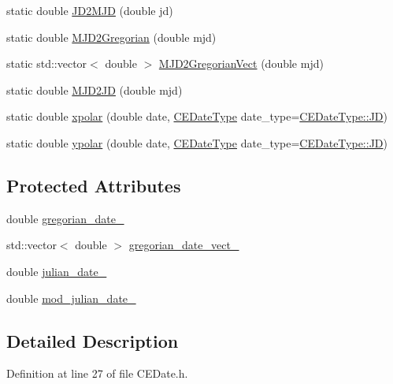 \begin{DoxyCompactItemize}
static double \hyperlink{class_c_e_date_a2f8aa5a0023c485407ce172c167d970d}{J\+D2\+M\+J\+D} (double jd)
\item 
static double \hyperlink{class_c_e_date_a3c33bc8e95c975087dab29645839794c}{M\+J\+D2\+Gregorian} (double mjd)
\item 
static std\+::vector$<$ double $>$ \hyperlink{class_c_e_date_a6e0489eaa084ffa934f2a661929e74cf}{M\+J\+D2\+Gregorian\+Vect} (double mjd)
\item 
static double \hyperlink{class_c_e_date_ad5610b1c2d2891dff856f5be07801272}{M\+J\+D2\+J\+D} (double mjd)
\item 
static double \hyperlink{class_c_e_date_ace399234c2715e61518393497511b293}{xpolar} (double date, \hyperlink{_c_e_date_8h_aa6b826beca26b0712061a4afc5ad7746}{C\+E\+Date\+Type} date\+\_\+type=\hyperlink{_c_e_date_8h_aa6b826beca26b0712061a4afc5ad7746aabf8d7515962e526421842e8456798cc}{C\+E\+Date\+Type\+::\+J\+D})
\item 
static double \hyperlink{class_c_e_date_a013d72a2273b76be18978a79c4d96166}{ypolar} (double date, \hyperlink{_c_e_date_8h_aa6b826beca26b0712061a4afc5ad7746}{C\+E\+Date\+Type} date\+\_\+type=\hyperlink{_c_e_date_8h_aa6b826beca26b0712061a4afc5ad7746aabf8d7515962e526421842e8456798cc}{C\+E\+Date\+Type\+::\+J\+D})
\end{DoxyCompactItemize}
\subsection*{Protected Attributes}
\begin{DoxyCompactItemize}
\item 
double \hyperlink{class_c_e_date_aecd5239b5cf81e46525ee24c6bf2b48e}{gregorian\+\_\+date\+\_\+}
\item 
std\+::vector$<$ double $>$ \hyperlink{class_c_e_date_a3f2468a5ab3c5e58a5da6b2800d88165}{gregorian\+\_\+date\+\_\+vect\+\_\+}
\item 
double \hyperlink{class_c_e_date_a58170c23976d025cd631d42b10b8930c}{julian\+\_\+date\+\_\+}
\item 
double \hyperlink{class_c_e_date_aa713ba7b4c88ce0d453d18fb756cc645}{mod\+\_\+julian\+\_\+date\+\_\+}
\end{DoxyCompactItemize}


\subsection{Detailed Description}


Definition at line 27 of file C\+E\+Date.\+h.



